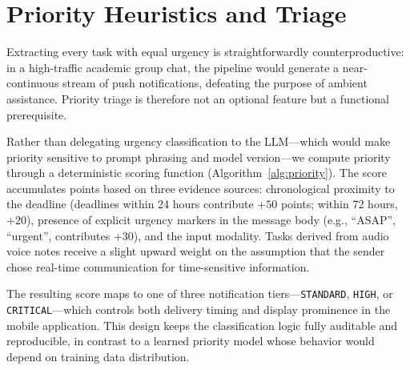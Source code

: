 \section{Priority Heuristics and Triage}
\label{sec:prompt_engineering}

Extracting every task with equal urgency is straightforwardly counterproductive: in a high-traffic academic group chat, the pipeline would generate a near-continuous stream of push notifications, defeating the purpose of ambient assistance. Priority triage is therefore not an optional feature but a functional prerequisite.

Rather than delegating urgency classification to the LLM—which would make priority sensitive to prompt phrasing and model version—we compute priority through a deterministic scoring function (Algorithm~\ref{alg:priority}). The score accumulates points based on three evidence sources: chronological proximity to the deadline (deadlines within 24 hours contribute $+50$ points; within 72 hours, $+20$), presence of explicit urgency markers in the message body (e.g., ``ASAP'', ``urgent'', contributes $+30$), and the input modality. Tasks derived from audio voice notes receive a slight upward weight on the assumption that the sender chose real-time communication for time-sensitive information.

The resulting score maps to one of three notification tiers—\texttt{STANDARD}, \texttt{HIGH}, or \texttt{CRITICAL}—which controls both delivery timing and display prominence in the mobile application. This design keeps the classification logic fully auditable and reproducible, in contrast to a learned priority model whose behavior would depend on training data distribution.
